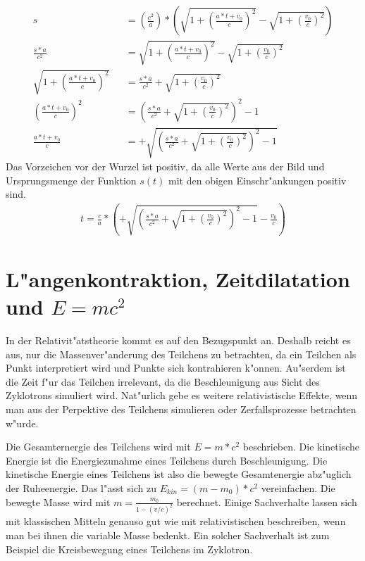 \documentclass[14pt, a4paper]{report}
\begin{document}
\begin{eqnarray}
s && = \left(\frac{c^2}{a}\right) * \left(\sqrt{1 + \left(\frac{a*t + v_0}{c}\right)^2} - \sqrt{1 + \left(\frac{v_0}{c}\right)^2}\right) \\
\frac{s*a}{c^2}&& = \sqrt{1 + \left(\frac{a*t + v_0}{c}\right)^2} - \sqrt{1 + \left(\frac{v_0}{c}\right)^2}\\
\sqrt{1 + \left(\frac{a*t + v_0}{c}\right)^2} &&= \frac{s*a}{c^2} + \sqrt{1 + \left(\frac{v_0}{c}\right)^2} \\
\left(\frac{a*t + v_0}{c}\right)^2 &&  = \left(\frac{s*a}{c^2} + \sqrt{1 + \left(\frac{v_0}{c}\right)^2}\right)^2 - 1 \\ 
\frac{a*t + v_0}{c} && = +\sqrt{\left(\frac{s*a}{c^2} + \sqrt{1 + \left(\frac{v_0}{c}\right)^2}\right)^2 - 1}
\end{eqnarray}
Das Vorzeichen vor der Wurzel ist positiv, da alle Werte aus der Bild und Ursprungsmenge 
der Funktion $s(t)$ mit den obigen Einschr"ankungen positiv sind.
\begin{eqnarray}
t = \frac{c}{a} * \left( +\sqrt{\left(\frac{s*a}{c^2} + \sqrt{1 + \left(\frac{v_0}{c}\right)^2}\right)^2 - 1} - \frac{v_0}{c}\right)
\end{eqnarray}

\section{L"angenkontraktion, Zeitdilatation und $E=mc^2$}
In der Relativit"atstheorie kommt es auf den Bezugspunkt an. Deshalb reicht es aus, nur
die Massenver"anderung des Teilchens zu betrachten, da ein Teilchen als Punkt 
interpretiert wird und Punkte sich kontrahieren k"onnen. Au"serdem ist die Zeit f"ur das 
Teilchen irrelevant, da die Beschleunigung aus Sicht des Zyklotrons simuliert wird.
Nat"urlich gebe es weitere relativistische Effekte, wenn man aus der Perpektive des 
Teilchens simulieren oder Zerfallsprozesse betrachten w"urde.

Die Gesamternergie des Teilchens wird mit $E = m*c^2$  beschrieben. Die kinetische Energie ist die 
Energiezunahme eines Teilchens durch Beschleunigung. Die kinetische Energie eines
Teilchens ist also die bewegte Gesamtenergie abz"uglich der Ruheenergie. Das l"asst sich zu 
$E_{kin} = (m-m_0)*c^2$ vereinfachen. Die bewegte Masse wird mit 
$m = \frac{m_0}{1-(v/c)^2}$ berechnet.
Einige Sachverhalte lassen sich mit klassischen Mitteln genauso gut wie mit 
relativistischen beschreiben, wenn man bei ihnen die variable Masse bedenkt. Ein solcher
Sachverhalt ist zum Beispiel die Kreisbewegung eines Teilchens im Zyklotron.
\end{document}
